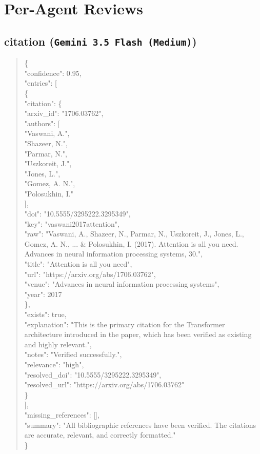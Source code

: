 \documentclass[11pt]{article}
\begin{document}
\section*{Per-Agent Reviews}
\subsection*{citation (\texttt{Gemini 3.5 Flash (Medium)})}
\begin{quote}\small\ttfamily\raggedright
\{\\
  "confidence": 0.95,\\
  "entries": [\\
    \{\\
      "citation": \{\\
        "arxiv\_id": "1706.03762",\\
        "authors": [\\
          "Vaswani, A.",\\
          "Shazeer, N.",\\
          "Parmar, N.",\\
          "Uszkoreit, J.",\\
          "Jones, L.",\\
          "Gomez, A. N.",\\
          "Polosukhin, I."\\
        ],\\
        "doi": "10.5555/3295222.3295349",\\
        "key": "vaswani2017attention",\\
        "raw": "Vaswani, A., Shazeer, N., Parmar, N., Uszkoreit, J., Jones, L., Gomez, A. N., ... \& Polosukhin, I. (2017). Attention is all you need. Advances in neural information processing systems, 30.",\\
        "title": "Attention is all you need",\\
        "url": "https://arxiv.org/abs/1706.03762",\\
        "venue": "Advances in neural information processing systems",\\
        "year": 2017\\
      \},\\
      "exists": true,\\
      "explanation": "This is the primary citation for the Transformer architecture introduced in the paper, which has been verified as existing and highly relevant.",\\
      "notes": "Verified successfully.",\\
      "relevance": "high",\\
      "resolved\_doi": "10.5555/3295222.3295349",\\
      "resolved\_url": "https://arxiv.org/abs/1706.03762"\\
    \}\\
  ],\\
  "missing\_references": [],\\
  "summary": "All bibliographic references have been verified. The citations are accurate, relevant, and correctly formatted."\\
\}\\
\end{quote}
\end{document}
